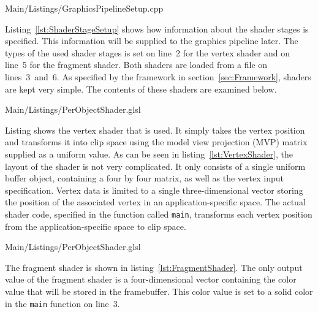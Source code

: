         
        {Main/Listings/GraphicsPipelineSetup.cpp}

        Listing~\ref{lst:ShaderStageSetup} shows how information about the shader stages is specified.
        This information will be supplied to the graphics pipeline later.
        The types of the used shader stages is set on line~2 for the vertex shader and on line~5 for the fragment shader.
        Both shaders are loaded from a file on lines~3~and~6.
        As specified by the framework in section~\ref{sec:Framework}, shaders are kept very simple.
        The contents of these shaders are examined below.

        
        {Main/Listings/PerObjectShader.glsl}

        Listing shows the vertex shader that is used.
        It simply takes the vertex position and transforms it into clip space using the model view projection (MVP) matrix supplied as a uniform value.
        As can be seen in listing~\ref{lst:VertexShader}, the layout of the shader is not very complicated.
        It only consists of a single uniform buffer object, containing a four by four matrix, as well as the vertex input specification.
        Vertex data is limited to a single three-dimensional vector storing the position of the associated vertex in an application-specific space.
        The actual shader code, specified in the function called \lstinline{main}, transforms each vertex position from the application-specific space to clip space.

        
        {Main/Listings/PerObjectShader.glsl}

        The fragment shader is shown in listing~\ref{lst:FragmentShader}.
        The only output value of the fragment shader is a four-dimensional vector containing the color value that will be stored in the framebuffer.
        This color value is set to a solid color in the \lstinline{main} function on line~3.


